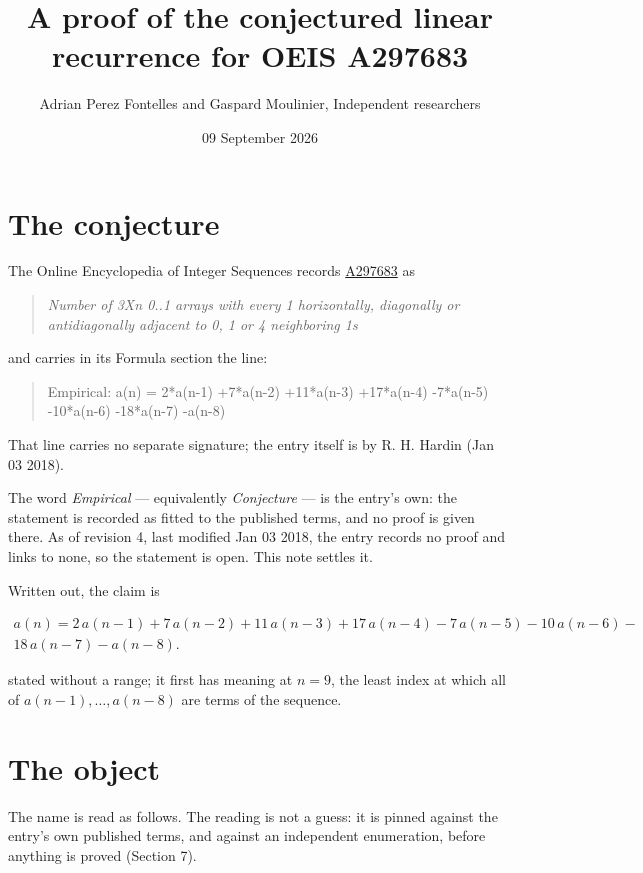 \documentclass[11pt]{article}
\title{A proof of the conjectured linear recurrence for OEIS A297683}
\author{Adrian Perez Fontelles and Gaspard Moulinier, Independent researchers}
\date{09 September 2026}
\theoremstyle{definition}
\begin{document}
\maketitle
\section{The conjecture}

The Online Encyclopedia of Integer Sequences records \href{https://oeis.org/A297683}{A297683} as

\begin{quote}\itshape Number of 3Xn 0..1 arrays with every 1 horizontally, diagonally or antidiagonally adjacent to 0, 1 or 4 neighboring 1s\end{quote}

and carries in its Formula section the line:

\begin{quote}\ttfamily Empirical: a(n) = 2*a(n-1) +7*a(n-2) +11*a(n-3) +17*a(n-4) -7*a(n-5) -10*a(n-6) -18*a(n-7) -a(n-8)\end{quote}

That line carries no separate signature; the entry itself is by R. H. Hardin (Jan 03 2018).

The word {\itshape Empirical} --- equivalently {\itshape Conjecture} --- is the entry's own: the statement is recorded as fitted to the published terms, and no proof is given there. As of revision 4, last modified Jan 03 2018, the entry records no proof and links to none, so the statement is open. This note settles it.

Written out, the claim is

\begin{multline*} a(n) = 2\,a(n-1) + 7\,a(n-2) + 11\,a(n-3) + 17\,a(n-4) - 7\,a(n-5) - 10\,a(n-6) - \\ 18\,a(n-7) - a(n-8). \end{multline*}

stated without a range; it first has meaning at $n = 9$, the least index at which all of $a(n-1),\dots,a(n-8)$ are terms of the sequence.

\section{The object}

The name is read as follows. The reading is not a guess: it is pinned against the entry's own published terms, and against an independent enumeration, before anything is proved (Section 7).
\end{document}
